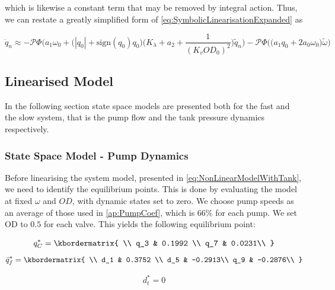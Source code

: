 which is likewise a constant term that may be removed by integral action. Thus, we can restate a greatly simplified form of \cref{eq:SymbolicLinearisationExpanded} as

\begin{equation}\label{eq:SymbolicLinearisationSimplified}
	\dot{q}_n \approx -\mathcal{P}\Phi\Bigg(a_1\omega_0 + \Big(|q_0|+\text{sign}(q_0)q_0\Big)\Bigg(K_\lambda + a_2 + \frac{1}{(K_v OD_0)^2}\Bigg) \tilde{q}_n \Bigg) -  \mathcal{P}\Phi\Bigg(\Big(a_1 q_0 + 2a_0\omega_0\Big) \tilde{\omega}\Bigg)
\end{equation}

\subsection{Linearised Model} \label{sec:LinearisedModel}
In the following section state space models are presented both for the fast and the slow system, that is the pump flow and the tank pressure dynamics respectively. 

\subsubsection{State Space Model - Pump Dynamics}
Before linearising the system model, presented in \cref{eq:NonLinearModelWithTank}, we need to identify the equilibrium points. This is done by evaluating the model at fixed $ \omega $ and $ OD $, with dynamic states set to zero. We choose pump speeds as an average of those used in \cref{ap:PumpCoef}, which is $ 66\% $ for each pump. We set OD to $ 0.5 $ for each valve. This yields the following equilibrium point:

	\begin{equation}
	q_C^* = \kbordermatrix{
		\\
		q_3 & 0.1992 \\ 
		q_7 & 0.0231\\
	}
\end{equation}
	\begin{equation}
	\bar{q}_f^* = \kbordermatrix{
		\\
		d_1 & 0.3752 \\ 
		d_5 & -0.2913\\
		q_9 & -0.2876\\
	}
	\end{equation}

\begin{equation}
	d_t^* = 0
\end{equation}


